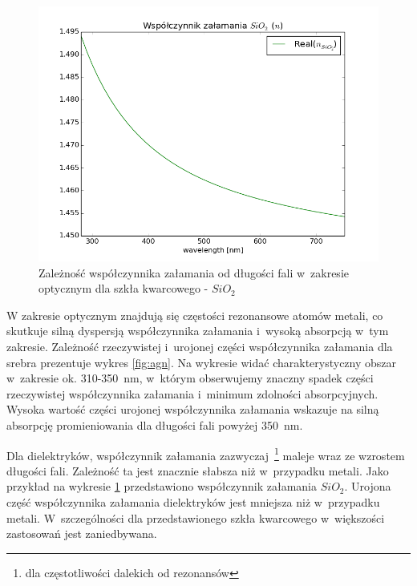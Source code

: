\begin{figure}[tb]
	\includegraphics[width=\textwidth]{images/sio2n.png}
	\caption{Zależność współczynnika załamania od długości fali w~zakresie optycznym dla szkła kwarcowego -  $SiO_2$ \cite{MALITSON:65}   }
	\label{fig:sio2n}
\end{figure}
W zakresie optycznym znajdują się częstości rezonansowe atomów metali, co skutkuje silną dyspersją współczynnika załamania i~wysoką absorpcją w~tym zakresie. Zależność rzeczywistej i~urojonej części współczynnika załamania  dla srebra prezentuje wykres \ref{fig:agn}. Na wykresie widać charakterystyczny obszar w~zakresie ok. 310-350~nm, w~którym obserwujemy znaczny spadek części rzeczywistej współczynnika załamania i~minimum zdolności absorpcyjnych. Wysoka wartość części urojonej współczynnika załamania wskazuje na silną absorpcję promieniowania dla długości fali powyżej 350~nm.

Dla dielektryków, współczynnik załamania zazwyczaj~\footnote{dla częstotliwości dalekich od rezonansów} maleje wraz ze wzrostem długości fali. Zależność ta jest znacznie słabsza niż w~przypadku metali. Jako przykład na wykresie \ref{fig:sio2n} przedstawiono współczynnik załamania $SiO_2$. Urojona część współczynnika załamania dielektryków jest mniejsza niż w~przypadku metali. W~szczególności dla przedstawionego szkła kwarcowego w~większości zastosowań jest zaniedbywana.

